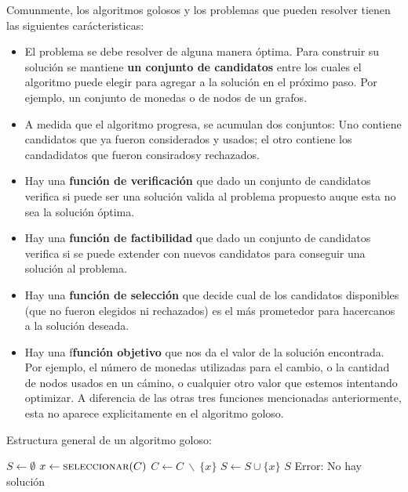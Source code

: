 Comunmente, los algoritmos golosos y los problemas que pueden resolver tienen las siguientes carácteristicas:
\begin{itemize}
	\item El problema se debe resolver de alguna manera óptima. Para construir su solución se mantiene \textbf{un conjunto de candidatos} entre los cuales el algoritmo puede elegir para agregar a la solución en el próximo paso. Por ejemplo, un conjunto de monedas o de nodos de un grafos.
	\item A medida que el algoritmo progresa, se acumulan dos conjuntos: Uno contiene candidatos que ya fueron considerados y usados; el otro contiene los candadidatos que fueron consiradosy rechazados.
	\item Hay una \textbf{función de verificación} que dado un conjunto de candidatos verifica si puede ser una solución valida al problema propuesto auque esta no sea la solución óptima.
	\item Hay una \textbf{función de factibilidad} que dado un conjunto de candidatos verifica si se puede extender con nuevos candidatos para conseguir una solución al problema.
	\item Hay una \textbf{función de selección} que decide cual de los candidatos disponibles (que no fueron elegidos ni rechazados) es el más prometedor para hacercanos a la solución deseada.
	\item Hay una f\textbf{función objetivo} que nos da el valor de la solución encontrada. Por ejemplo, el número de monedas utilizadas para el cambio, o la cantidad de nodos usados en un cámino, o cualquier otro valor que estemos intentando optimizar. A diferencia de las otras tres funciones mencionadas anteriormente, esta no aparece explicitamente en el algoritmo goloso.
\end{itemize}

Estructura general de un algoritmo goloso:

\begin{algorithmic}
	\State \(S\gets\emptyset\)
		\State \(x \gets \Call{seleccionar}{C}\)
		\State \(C \gets C~\backslash~\{x\}\)
			\State \(S\gets S\cup\{x\}\)
		\EndIf
	\EndWhile
		\Return \(S\)
	\Else
		\State\Return Error: No hay solución
	\EndIf
	\EndFunction
\end{algorithmic}

